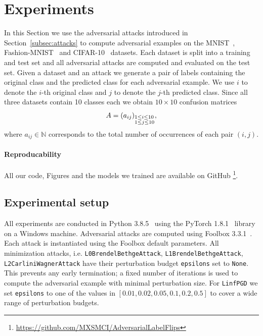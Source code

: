 \documentclass{article}
\begin{document}
\section{Experiments}
\label{sec:experiments}

In this Section we use the adversarial attacks introduced in Section~\ref{subsec:attacks} to compute adversarial examples on the MNIST~\cite{deng2012mnist}, Fashion-MNIST~\cite{xiao2017fashion} and CIFAR-10~\cite{krizhevsky2009learning} datasets. Each dataset is split into a training and test set and all adversarial attacks are computed and evaluated on the test set. Given a dataset and an attack we generate a pair of labels containing the original class and the predicted class for each adversarial example. We use $i$ to denote the $i$-th original class and $j$ to denote the $j$-th predicted class. Since all three datasets contain 10 classes each we obtain $10\times10$ confusion matrices
\[A=(a_{ij})_{\begin{subarray}{l} 1\le i\le 10 \\ 1\le j\le 10\end{subarray}},\]
where $a_{ij}\in\mathbb{N}$ corresponds to the total number of occurrences of each pair $(i,j)$.

\paragraph{Reproducability}All our code, Figures and the models we trained are available on GitHub \footnote{\url{https://github.com/MXSMCI/AdversarialLabelFlips}}.

\subsection{Experimental setup}
All experiments are conducted in Python 3.8.5~\cite{van1995python} using the PyTorch 1.8.1~\cite{pytorch} library on a Windows machine. Adversarial attacks are computed using Foolbox 3.3.1~\cite{rauber2017foolbox}. Each attack is instantiated using the Foolbox default parameters. All minimization attacks, i.e. \texttt{L0BrendelBethgeAttack}, \texttt{L1BrendelBethgeAttack}, \texttt{L2CarliniWagnerAttack} have their perturbation budget \texttt{epsilons} set to \texttt{None}. This prevents any early termination; a fixed number of iterations is used to compute the adversarial example with minimal perturbation size. For \texttt{LinfPGD} we set \texttt{epsilons} to one of the values in $[0.01, 0.02, 0.05, 0.1, 0.2, 0.5]$ to cover a wide range of perturbation budgets.
\end{document}
